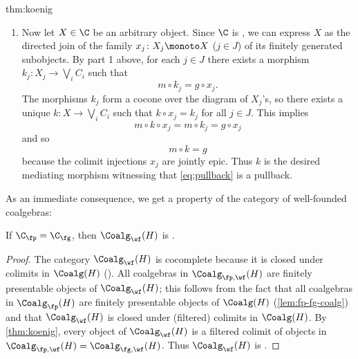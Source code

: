 \begin{proofappendix}{thm:koenig}
\begin{enumerate}
\begin{equation}
\end{equation}
Indeed, commutativity of the left-hand part is witnessed by the following diagram:
\[
\begin{tikzcd}
X  \ar{d}[swap]{g} \ar[shiftarr={yshift=7mm}]{rrr}{k} \ar{r}{\inr} & C_i+X \ar{d}{[m_i,g]} \ar{r}{e} & C_j \ar{d}{m_j} \ar{r}{n_i} & \bigvee_i C_i \ar{d}{m} \\
C \ar[equals]{r} & C \ar[equals]{r} & C \ar[equals]{r} & C 
\end{tikzcd}
\]
Then also the upper part of \eqref{eq:pb-proof} commutes because it does so when postcomposed with the monomorphism $Hm$. The uniqueness of $k$ follows from $m$ being monic.
\item Now let $X\in \C$ be an arbitrary object. Since $\C$ is \lfp, we can express $X$ as the directed join of the family $x_j\colon X_j\monoto X$ ($j\in J$) of its finitely generated subobjects. By part 1 above, for each $j\in J$ there exists a morphism $k_j\colon X_j\to \bigvee_i C_i$ such that
\[ m\circ k_j = g\circ x_j. \]
The morphisms $k_j$ form a cocone over the diagram of $X_j$'s, so there exists a unique $k\colon X\to \bigvee_i C_i$ such that $k\circ x_j = k_j$ for all $j\in J$. This implies
\[ m\circ k\circ x_j = m\circ k_j = g\circ x_j  \]
and so
\[ m\circ k = g \]
because the colimit injections $x_j$ are jointly epic. Thus $k$ is the desired mediating morphism witnessing that \eqref{eq:pullback} is a pullback.\qedhere
\end{enumerate}
\end{proofappendix}


As an immediate consequence, we get a property of the category of well-founded coalgebras:

\begin{corollary}[\smash{\injmono}, \hpresint]\label{cor:wfIsLFP}
If $\C_\fp=\C_\fg$, then $\Coalg_\wf(H)$ is \lfp. 
\end{corollary}

\begin{proof}
The category $\Coalg_\wf(H)$ is cocomplete because it is closed under colimits in $\Coalg(H)$ (). All coalgebras in $\Coalg_{\fp,\wf}(H)$ 
are finitely presentable objects of $\Coalg_\wf(H)$; this follows from the fact that all coalgebras in $\Coalg_\fp(H)$ are finitely presentable objects of $\Coalg(H)$ (\autoref{lem:fp-fg-coalg}) and that $\Coalg_\wf(H)$ is closed under (filtered) colimits in $\Coalg(H)$. By \autoref{thm:koenig}, every object of $\Coalg_\wf(H)$ is a filtered colimit of objects in $\Coalg_{\fp,\wf}(H)=\Coalg_{\fg,\wf}(H)$. Thus $\Coalg_\wf(H)$ is \lfp. 
\end{proof}

